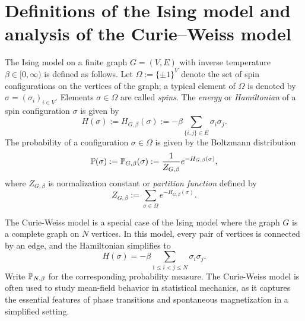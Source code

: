 \section{Definitions of the Ising model and analysis of the Curie--Weiss model}
\label{sec:definitions_examples}

\begin{definition}
    The Ising model on a finite graph \( G = (V, E) \) with inverse temperature \( \beta \in [0,\infty) \) is defined as follows.
    Let $\Omega:=\{\pm1\}^V$ denote the set of spin configurations on the vertices of the graph;
    a typical element of $\Omega$ is denoted by $\sigma=(\sigma_i)_{i\in V}$.
    Elements $\sigma\in\Omega$ are called \emph{spins}.
    The \emph{energy} or \emph{Hamiltonian} of a spin configuration $\sigma$ is given by
    \[
    H(\sigma) := H_{G,\beta}(\sigma) := -\beta \sum_{\{i,j\} \in E} \sigma_i \sigma_j.
    \]
    The probability of a configuration \(\sigma\in\Omega\) is given by the Boltzmann distribution
    \[
    \P(\sigma) := \P_{G,\beta}(\sigma) := \frac{1}{Z_{G,\beta}} e^{-H_{G,\beta}(\sigma)},
    \]
    where \(Z_{G,\beta}\) is normalization constant or \emph{partition function} defined by
    \[
    Z_{G,\beta} := \sum_{\sigma\in\Omega} e^{-H_{G,\beta}(\sigma)}.
    \]
\end{definition}

\begin{definition}
    The Curie-Weiss model is a special case of the Ising model where the graph \( G \) is a complete graph on \( N \) vertices. In this model, every pair of vertices is connected by an edge, and the Hamiltonian simplifies to
    \[
    H(\sigma) = -\beta \sum_{1 \leq i < j \leq N} \sigma_i \sigma_j.
    \]
    Write $\P_{N,\beta}$ for the corresponding probability measure.
    The Curie-Weiss model is often used to study mean-field behavior in statistical mechanics, as it captures the essential features of phase transitions and spontaneous magnetization in a simplified setting.
\end{definition}

